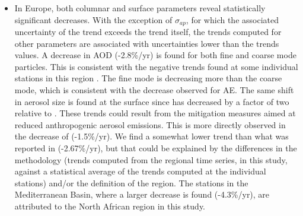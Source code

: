\documentclass[acp, manuscript]{copernicus}
\begin{document}
\begin{itemize}
 \item In Europe, both columnar and surface parameters reveal statistically significant decreases. With the exception of $\sigma_{ap}$, for which the associated uncertainty of the trend exceeds the trend itself, the trends computed for other parameters are associated with uncertainties lower than the trends values. A decrease in AOD (-2.8\%/yr) is found for both fine and coarse mode particles. This is consistent with the negative trends found at some individual stations in this region \citep{glantz2019}. The fine mode is decreasing more than the coarse mode, which is consistent with the decrease observed for AE. The same shift in aerosol size is found at the surface since  has decreased by a factor of two relative to . These trends could result from the mitigation measures aimed at reduced anthropogenic aerosol emissions. This is more directly observed in the decrease of  (-1.5\%/yr). We find a somewhat lower trend than what was reported in \cite{aas2019global} (-2.67\%/yr), but that could be explained by the differences in the methodology (trends computed from the regional time series, in this study, against a statistical average of the trends computed at the individual stations) and/or the definition of the region. The stations in the Mediterranean Basin, where a larger decrease is found (-4.3\%/yr), are attributed to the North African region in this study.
 

\end{itemize}
\end{document}
